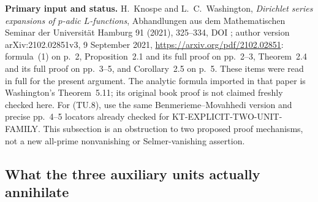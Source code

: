 \documentclass[11pt,a4paper]{article}
\theoremstyle{definition}
\renewcommand{\paragraph}[1]{\par\smallskip\noindent\textbf{#1}\quad\ignorespaces}
\begin{document}
\paragraph{Primary input and status.}
H.~Knospe and L.~C.~Washington, \emph{Dirichlet series
expansions of $p$-adic $L$-functions}, Abhandlungen aus dem
Mathematischen Seminar der Universit\"at Hamburg 91 (2021),
325--334, DOI ; author
version arXiv:2102.02851v3, 9 September 2021,
\url{https://arxiv.org/pdf/2102.02851}:
formula~(1) on p.~2, Proposition~2.1 and its full proof on
pp.~2--3, Theorem~2.4 and its full proof on pp.~3--5, and
Corollary~2.5 on p.~5.  These items were read in full for
the present argument.  The analytic formula imported in
that paper is Washington's Theorem~5.11; its original book
proof is not claimed freshly checked here.
For (TU.8), use the same Benmerieme--Movahhedi version and
precise pp.~4--5 locators already checked for
KT-EXPLICIT-TWO-UNIT-FAMILY.  This subsection is an
obstruction to two proposed proof mechanisms, not a new
all-prime nonvanishing or Selmer-vanishing assertion.



\subsection{What the three auxiliary units actually annihilate}
\label{sec:kt-auxiliary-unit-bridge}
\end{document}
